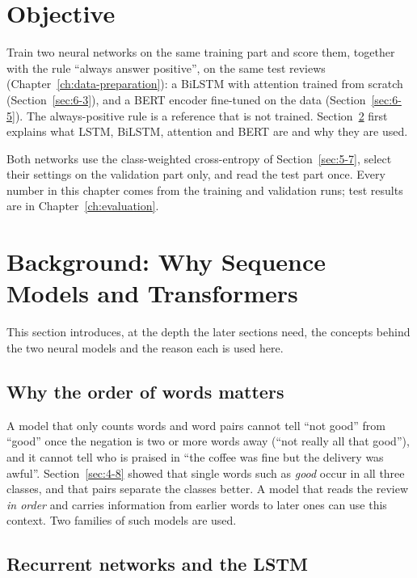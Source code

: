 \section{Objective}
\label{sec:6-1}

Train two neural networks on the same training part and score them, together with the rule ``always answer positive'', on the same test reviews (Chapter~\ref{ch:data-preparation}): a BiLSTM with attention trained from scratch (Section~\ref{sec:6-3}), and a BERT encoder fine-tuned on the data (Section~\ref{sec:6-5}). The always-positive rule is a reference that is not trained. Section~\ref{sec:6-bg} first explains what LSTM, BiLSTM, attention and BERT are and why they are used.

Both networks use the class-weighted cross-entropy of Section~\ref{sec:5-7}, select their settings on the validation part only, and read the test part once. Every number in this chapter comes from the training and validation runs; test results are in Chapter~\ref{ch:evaluation}.

\section{Background: Why Sequence Models and Transformers}
\label{sec:6-bg}

This section introduces, at the depth the later sections need, the concepts behind the two neural models and the reason each is used here.

\subsection*{Why the order of words matters}

A model that only counts words and word pairs cannot tell ``not good'' from ``good'' once the negation is two or more words away (``not really all that good''), and it cannot tell who is praised in ``the coffee was fine but the delivery was awful''. Section~\ref{sec:4-8} showed that single words such as \emph{good} occur in all three classes, and that pairs separate the classes better. A model that reads the review \emph{in order} and carries information from earlier words to later ones can use this context. Two families of such models are used.

\subsection*{Recurrent networks and the LSTM}

